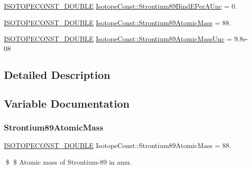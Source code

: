 \begin{DoxyCompactItemize}
\mbox{\hyperlink{group___isotope_const-_macros_ga8f45a7272ce02c0b4c65c44636ed719a}{I\+S\+O\+T\+O\+P\+E\+C\+O\+N\+S\+T\+\_\+\+D\+O\+U\+B\+LE}} \mbox{\hyperlink{group___isotope_const-_strontium-_sr89_gac93be7d06b89ba40d6d8d5c1f60244cd}{Isotope\+Const\+::\+Strontium89\+Bind\+E\+Per\+A\+Unc}} = 0.
\item 
\mbox{\hyperlink{group___isotope_const-_macros_ga8f45a7272ce02c0b4c65c44636ed719a}{I\+S\+O\+T\+O\+P\+E\+C\+O\+N\+S\+T\+\_\+\+D\+O\+U\+B\+LE}} \mbox{\hyperlink{group___isotope_const-_strontium-_sr89_ga1f3333ca62e78f73feceb8b97241fe5c}{Isotope\+Const\+::\+Strontium89\+Atomic\+Mass}} = 88.
\item 
\mbox{\hyperlink{group___isotope_const-_macros_ga8f45a7272ce02c0b4c65c44636ed719a}{I\+S\+O\+T\+O\+P\+E\+C\+O\+N\+S\+T\+\_\+\+D\+O\+U\+B\+LE}} \mbox{\hyperlink{group___isotope_const-_strontium-_sr89_ga30e4194e0a3ef532215e0b2939f6c1da}{Isotope\+Const\+::\+Strontium89\+Atomic\+Mass\+Unc}} = 9.\+8e-\/08
\end{DoxyCompactItemize}


\subsection{Detailed Description}


\subsection{Variable Documentation}
\mbox{\label{group___isotope_const-_strontium-_sr89_ga1f3333ca62e78f73feceb8b97241fe5c}} 
\subsubsection{\texorpdfstring{Strontium89\+Atomic\+Mass}{Strontium89AtomicMass}}
{\footnotesize\ttfamily \mbox{\hyperlink{group___isotope_const-_macros_ga8f45a7272ce02c0b4c65c44636ed719a}{I\+S\+O\+T\+O\+P\+E\+C\+O\+N\+S\+T\+\_\+\+D\+O\+U\+B\+LE}} Isotope\+Const\+::\+Strontium89\+Atomic\+Mass = 88.}

\$ \$ Atomic mass of Strontium-\/89 in amu. \mbox{\label{group___isotope_const-_strontium-_sr89_ga30e4194e0a3ef532215e0b2939f6c1da}} 
